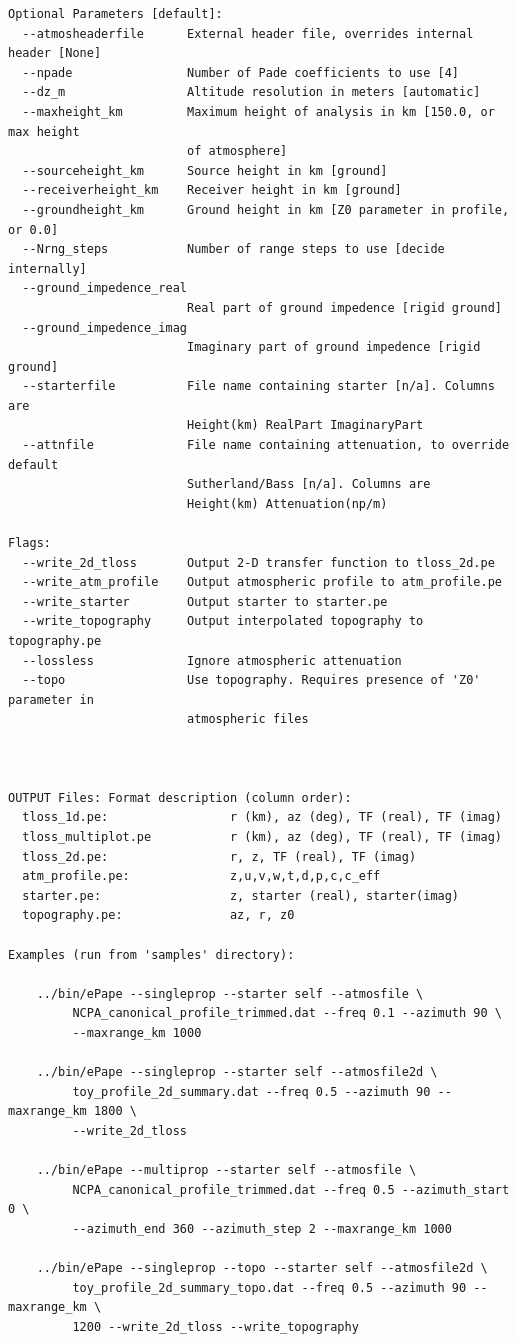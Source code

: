 \begin{verbatim}
Optional Parameters [default]:
  --atmosheaderfile      External header file, overrides internal header [None]
  --npade                Number of Pade coefficients to use [4]
  --dz_m                 Altitude resolution in meters [automatic]
  --maxheight_km         Maximum height of analysis in km [150.0, or max height
                         of atmosphere]
  --sourceheight_km      Source height in km [ground]
  --receiverheight_km    Receiver height in km [ground]
  --groundheight_km      Ground height in km [Z0 parameter in profile, or 0.0]
  --Nrng_steps           Number of range steps to use [decide internally]
  --ground_impedence_real
                         Real part of ground impedence [rigid ground]
  --ground_impedence_imag
                         Imaginary part of ground impedence [rigid ground]
  --starterfile          File name containing starter [n/a]. Columns are
                         Height(km) RealPart ImaginaryPart
  --attnfile             File name containing attenuation, to override default
                         Sutherland/Bass [n/a]. Columns are
                         Height(km) Attenuation(np/m)

Flags:
  --write_2d_tloss       Output 2-D transfer function to tloss_2d.pe
  --write_atm_profile    Output atmospheric profile to atm_profile.pe
  --write_starter        Output starter to starter.pe
  --write_topography     Output interpolated topography to topography.pe
  --lossless             Ignore atmospheric attenuation
  --topo                 Use topography. Requires presence of 'Z0' parameter in
                         atmospheric files



OUTPUT Files: Format description (column order):
  tloss_1d.pe:                 r (km), az (deg), TF (real), TF (imag)
  tloss_multiplot.pe           r (km), az (deg), TF (real), TF (imag)
  tloss_2d.pe:                 r, z, TF (real), TF (imag)
  atm_profile.pe:              z,u,v,w,t,d,p,c,c_eff
  starter.pe:                  z, starter (real), starter(imag)
  topography.pe:               az, r, z0

Examples (run from 'samples' directory):

    ../bin/ePape --singleprop --starter self --atmosfile \
         NCPA_canonical_profile_trimmed.dat --freq 0.1 --azimuth 90 \
         --maxrange_km 1000

    ../bin/ePape --singleprop --starter self --atmosfile2d \
         toy_profile_2d_summary.dat --freq 0.5 --azimuth 90 --maxrange_km 1800 \
         --write_2d_tloss

    ../bin/ePape --multiprop --starter self --atmosfile \
         NCPA_canonical_profile_trimmed.dat --freq 0.5 --azimuth_start 0 \
         --azimuth_end 360 --azimuth_step 2 --maxrange_km 1000

    ../bin/ePape --singleprop --topo --starter self --atmosfile2d \
         toy_profile_2d_summary_topo.dat --freq 0.5 --azimuth 90 --maxrange_km \
         1200 --write_2d_tloss --write_topography

\end{verbatim}

